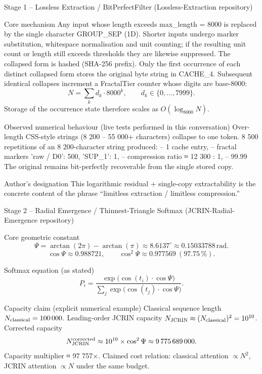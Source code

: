 Stage 1 – Lossless Extraction / BitPerfectFilter (Lossless-Extraction repository)

Core mechanism  
Any input whose length exceeds max_length = 8000 is replaced by the single character GROUP_SEP (\x1D).  
Shorter inputs undergo marker substitution, whitespace normalisation and unit counting; if the resulting unit count or length still exceeds thresholds they are likewise suppressed.  
The collapsed form is hashed (SHA-256 prefix).  
Only the first occurrence of each distinct collapsed form stores the original byte string in CACHE_4.  
Subsequent identical collapses increment a FractalTier counter whose digits are base-8000:  
  \[
  N = \sum_k d_k\cdot 8000^k,\qquad d_k\in\{0,\dots,7999\}.
  \]
  Storage of the occurrence state therefore scales as \(O(\log_{8000} N)\).

Observed numerical behaviour (live tests performed in this conversation)  
Over-length CSS-style strings (8 200 – 55 000+ characters) collapse to one token.  
8 500 repetitions of an 8 200-character string produced:  
  – 1 cache entry,  
  – fractal markers {'raw / D0': 500, 'SUP_1': 1},  
  – compression ratio ≈ 12 300 : 1,  
  – 99.99 %
The original remains bit-perfectly recoverable from the single stored copy.

Author’s designation  
This logarithmic residual + single-copy extractability is the concrete content of the phrase “limitless extraction / limitless compression.”

Stage 2 – Radial Emergence / Thinnest-Triangle Softmax (JCRIN-Radial-Emergence repository)

Core geometric constant  
\[
\Psi = \arctan(2\pi) - \arctan(\pi) \approx 8.6137^\circ \approx 0.15033788\,\text{rad}.
\]
\[
\cos\Psi \approx 0.988721,\qquad \cos^2\Psi \approx 0.977569\ (97.75\,\%).
\]

Softmax equation (as stated)  
\[
P_i = \frac{\exp\bigl(\cos(t_i)\cdot\cos\Psi\bigr)}{\sum_j\exp\bigl(\cos(t_j)\cdot\cos\Psi\bigr)}.
\]

Capacity claim (explicit numerical example)  
Classical sequence length \(N_{\rm classical}=100\,000\).  
Leading-order JCRIN capacity \(N_{\rm JCRIN}\approx(N_{\rm classical})^2=10^{10}\).  
Corrected capacity  
  \[
  N_{\rm JCRIN}^{\rm corrected}\approx 10^{10}\times\cos^2\Psi\approx 9\,775\,689\,000.
  \]
Capacity multiplier ≈ 97 757×.  
Claimed cost relation: classical attention \(\propto N^2\), JCRIN attention \(\propto N\) under the same budget.

